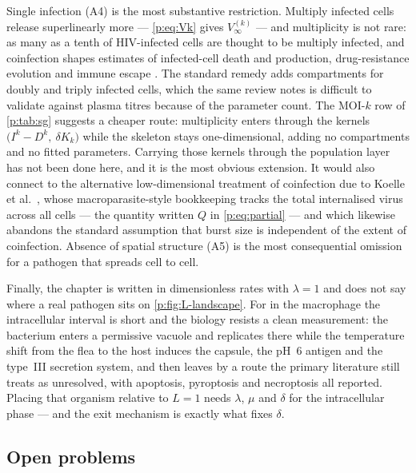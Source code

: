 Single infection (A4) is the most substantive restriction. Multiply infected
cells release superlinearly more --- \cref{p:eq:Vk} gives $V_\infty^{(k)}$
--- and multiplicity is not rare: as many as a tenth of HIV-infected cells
are thought to be multiply infected, and coinfection shapes estimates of
infected-cell death and production, drug-resistance evolution and immune
escape \cite{ciupe2024incorporating}. The standard remedy adds compartments
for doubly and triply infected cells, which the same review notes is
difficult to validate against plasma titres because of the parameter count.
The MOI-$k$ row of \cref{p:tab:sg} suggests a cheaper route: multiplicity
enters through the kernels
$\bigl(I^k-D^k,\ \delta K_k\bigr)$ while the skeleton stays
one-dimensional, adding no compartments and no fitted parameters. Carrying
those kernels through the population layer has not been done here, and it is
the most obvious extension. It would also connect to the alternative
low-dimensional treatment of coinfection due to Koelle et al.\
\cite{koelle2019within}, whose macroparasite-style bookkeeping tracks the
total internalised virus across all cells --- the quantity written $Q$ in
\cref{p:eq:partial} --- and which likewise abandons the standard assumption
that burst size is independent of the extent of coinfection. Absence of
spatial structure (A5) is the most consequential omission for a pathogen
that spreads cell to cell.

Finally, the chapter is written in dimensionless rates with $\lambda=1$ and
does not say where a real pathogen sits on \cref{p:fig:L-landscape}. For
\yp{} in the macrophage the intracellular interval is short and the biology
resists a clean measurement: the bacterium enters a permissive vacuole and
replicates there while the temperature shift from the flea to the host
induces the capsule, the pH~6 antigen and the type~III secretion system, and
then leaves by a route the primary literature still treats as unresolved,
with apoptosis, pyroptosis and necroptosis all reported. Placing that
organism relative to $L=1$ needs $\lambda$, $\mu$ and $\delta$ for the
intracellular phase --- and the exit mechanism is exactly what fixes
$\delta$.

\subsection{Open problems}
\label{p:sec:open-problems}

